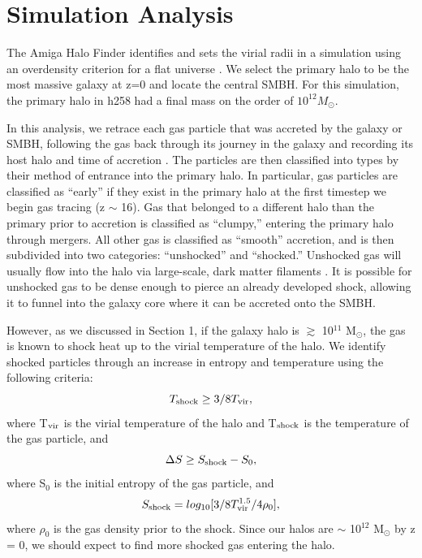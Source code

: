 \documentclass[manuscript]{aastex}
\begin{document}

\section{Simulation Analysis}\label{redux}

The Amiga Halo Finder identifies and sets the virial radii in a simulation using an overdensity criterion for a flat universe \citep{Knebe2001,Knollmann2009,Gill2004}. We select the primary halo to be the most massive galaxy at z=0 and locate the central SMBH. For this simulation, the primary halo in h258 had a final mass on the order of $10^{12} M_{\odot}$.  

In this analysis, we retrace each gas particle that was accreted by the galaxy or SMBH, following the gas back through its journey in the galaxy and recording its host halo and time of accretion \citep{Brooks2009}. The particles are then classified into types by their method of entrance into the primary halo. In particular, gas particles are classified as ``early'' if they exist in the primary halo at the first timestep we begin gas tracing (z $\sim$ 16). Gas that belonged to a different halo than the primary prior to accretion is classified as ``clumpy,'' entering the primary halo through mergers. All other gas is classified as ``smooth'' accretion, and is then subdivided into two categories: ``unshocked'' and ``shocked.'' Unshocked gas will usually flow into the halo via large-scale, dark matter filaments \citep{Bellovary2013}. It is possible for unshocked gas to be dense enough to pierce an already developed shock, allowing it to funnel into the galaxy core where it can be accreted onto the SMBH.

However, as we discussed in Section 1, if the galaxy halo is $\gtrsim$ 10$^{11}$ M$_{\odot} $, the gas is known to shock heat up to the virial temperature of the halo. We identify shocked particles through an increase in entropy and temperature using the following criteria:
\begin{equation}
T_{\rm shock} \geq 3/8 T_{\rm vir},
\end{equation}
where T$_{\rm vir}$ is the virial temperature of the halo and T$_{\rm shock}$ is the temperature of the gas particle, and 
\begin{equation}
\Delta S \geq S_{\rm shock} - S_0,
\end{equation}
where S$_0$ is the initial entropy of the gas particle, and 
\begin{equation}
S_{\rm shock} = log_{10}[3/8 T_{\rm vir}^{1.5}/4 \rho_0],
\end{equation}
where $\rho_0$ is the gas density prior to the shock. Since our halos are $\sim$ 10$^{12}$ M$_{\odot} $ by z = 0, we should expect to find more shocked gas entering the halo.
\end{document}
